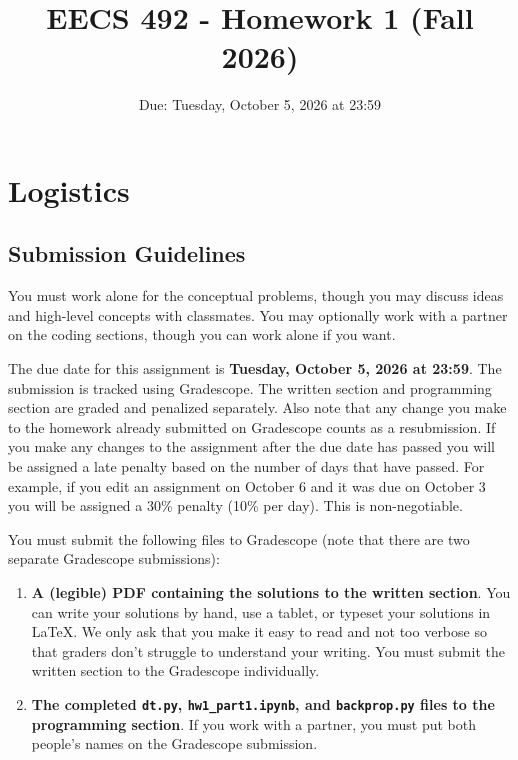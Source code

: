 \documentclass{homework}
\title{EECS 492 - Homework 1 (Fall 2026)}
\author{Due: Tuesday, October 5, 2026 at 23:59}
\date{}
\begin{document}
\maketitle

\section*{Logistics}
\subsection*{Submission Guidelines}
You must work alone for the conceptual problems, though you may discuss ideas and high-level concepts with classmates. You may optionally work with a partner on the coding sections, though you can work alone if you want. 

The due date for this assignment is \textbf{Tuesday, October 5, 2026 at 23:59}. The submission is tracked using Gradescope. The written section and programming section are graded and penalized separately. Also note that any change you make to the homework already submitted on Gradescope counts as a resubmission. If you make any changes to the assignment after the due date has passed you will be assigned a late penalty based on the number of days that have passed. For example, if you edit an assignment on October 6 and it was due on October 3 you will be assigned a 30\% penalty (10\% per day). This is non-negotiable.

You must submit the following files to Gradescope (note that there are two separate Gradescope submissions):
\begin{enumerate}
    \item \textbf{A (legible) PDF containing the solutions to the written section}. You can write your solutions by hand, use a tablet, or typeset your solutions in \LaTeX. We only ask that you make it easy to read and not too verbose so that graders don't struggle to understand your writing. You must submit the written section to the Gradescope individually.
    \item \textbf{The completed \texttt{dt.py}, \texttt{hw1\_part1.ipynb}, and \texttt{backprop.py} files to the programming section}. If you work with a partner, you must put both people's names on the Gradescope submission.
\end{enumerate}
\end{document}
